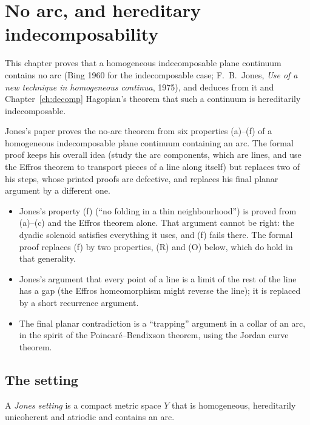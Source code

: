 \chapter{No arc, and hereditary indecomposability}\label{ch:noarc}

This chapter proves that a homogeneous indecomposable plane continuum contains no arc (Bing 1960 for the
indecomposable case; F.~B.~Jones, \emph{Use of a new technique in homogeneous continua}, 1975), and deduces from
it and Chapter~\ref{ch:decomp} Hagopian's theorem that such a continuum is hereditarily indecomposable.

Jones's paper proves the no-arc theorem from six properties (a)--(f) of a homogeneous indecomposable plane
continuum containing an arc. The formal proof keeps his overall idea (study the arc components, which are lines,
and use the Effros theorem to transport pieces of a line along itself) but replaces two of his steps, whose
printed proofs are defective, and replaces his final planar argument by a different one.

\begin{itemize}
\item Jones's property (f) (``no folding in a thin neighbourhood'') is proved from (a)--(c) and the Effros theorem
alone. That argument cannot be right: the dyadic solenoid satisfies everything it uses, and (f) fails there. The
formal proof replaces (f) by two properties, (R) and (O) below, which do hold in that generality.
\item Jones's argument that every point of a line is a limit of the rest of the line has a gap (the Effros
homeomorphism might reverse the line); it is replaced by a short recurrence argument.
\item The final planar contradiction is a ``trapping'' argument in a collar of an arc, in the spirit of the
Poincar\'e--Bendixson theorem, using the Jordan curve theorem.
\end{itemize}

\section{The setting}

\begin{definition}\label{def:jones-setting}
A \emph{Jones setting} is a compact metric space $Y$ that is homogeneous, hereditarily unicoherent and atriodic and
contains an arc.
\end{definition}

